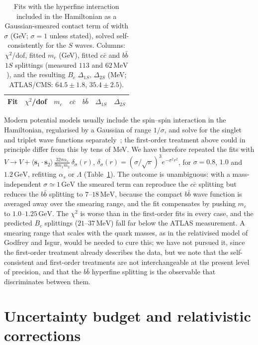 \documentclass[10pt,twocolumn]{article}
\newcommand{\Bc}{B_c}
\newcommand{\cc}{c\bar c}
\newcommand{\bb}{b\bar b}
\newcommand{\MeV}{\,\mathrm{MeV}}
\newcommand{\GeV}{\,\mathrm{GeV}}
\begin{document}
\begin{table}[t]
\caption{Fits with the hyperfine interaction included in the Hamiltonian as a Gaussian-smeared contact term of width $\sigma$ (GeV; $\sigma=1$ unless stated), solved self-consistently for the $S$ waves. Columns: $\chi^2$/dof, fitted $m_c$ (GeV), fitted $\cc$ and $\bb$ $1S$ splittings (measured $113$ and $62\MeV$), and the resulting $\Bc$ $\Delta_{1S}$, $\Delta_{2S}$ (MeV; ATLAS/CMS: $64.5\pm1.8$, $35.4\pm2.5$).}
\label{tab:sc}
\centering\small
\begin{tabular}{lcccccc}
\toprule
Fit & $\chi^2$/dof & $m_c$ & $\cc$ & $\bb$ & $\Delta_{1S}$ & $\Delta_{2S}$ \\
\midrule

\end{tabular}
\end{table}

Modern potential models usually include the spin--spin interaction in the Hamiltonian, regularised by a Gaussian of range $1/\sigma$, and solve for the singlet and triplet wave functions separately~\cite{BGS2005}; the first-order treatment above could in principle differ from this by tens of MeV.
We have therefore repeated the fits with $V\to V+\langle\mathbf s_1\!\cdot\!\mathbf s_2\rangle\,\frac{32\pi\alpha_s}{9m_1m_2}\,\delta_\sigma(r)$, $\delta_\sigma(r)=(\sigma/\sqrt\pi)^3e^{-\sigma^2r^2}$, for $\sigma=0.8$, $1.0$ and $1.2\GeV$, refitting $\alpha_s$ or $\Lambda$ (Table~\ref{tab:sc}).
The outcome is unambiguous: with a mass-independent $\sigma\simeq1\GeV$ the smeared term can reproduce the $\cc$ splitting but reduces the $\bb$ splitting to $7$--$18\MeV$, because the compact $\bb$ wave function is averaged away over the smearing range, and the fit compensates by pushing $m_c$ to $1.0$--$1.25\GeV$.
The $\chi^2$ is worse than in the first-order fits in every case, and the predicted $\Bc$ splittings ($21$--$37\MeV$) fall far below the ATLAS measurement.
A smearing range that scales with the quark masses, as in the relativised model of Godfrey and Isgur, would be needed to cure this; we have not pursued it, since the first-order treatment already describes the data, but we note that the self-consistent and first-order treatments are not interchangeable at the present level of precision, and that the $\bb$ hyperfine splitting is the observable that discriminates between them.

\section{Uncertainty budget and relativistic corrections}
\label{sec:budget}
\end{document}
